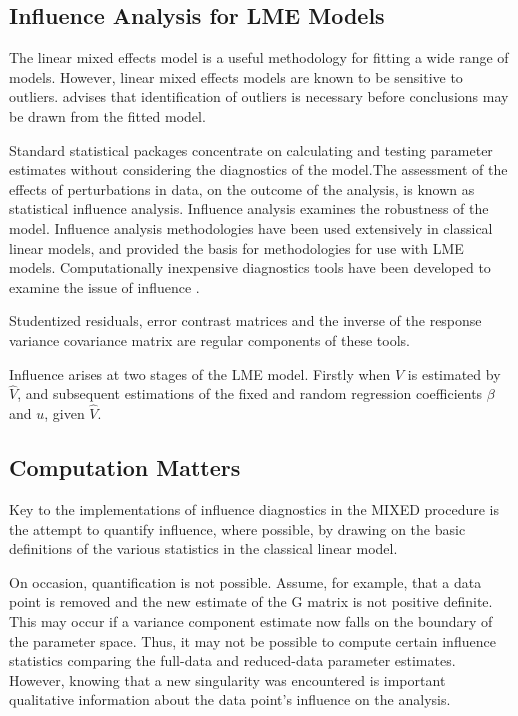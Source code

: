 \documentclass[Main.tex]{subfiles}
\begin{document}
	
		\subsection{Influence Analysis for LME Models} %
		The linear mixed effects model is a useful methodology for fitting a wide range of models. However, linear mixed effects models are known to be sensitive to outliers. \citet{CPJ} advises that identification of outliers is necessary before conclusions may be drawn from the fitted model.
		
		Standard statistical packages concentrate on calculating and testing parameter estimates without considering the diagnostics of the model.The assessment of the effects of perturbations in data, on the outcome of the analysis, is known as statistical influence analysis. Influence analysis examines the robustness of the model. Influence analysis methodologies have been used extensively in classical linear models, and provided the basis for methodologies for use with LME models.
		Computationally inexpensive diagnostics tools have been developed to examine the issue of influence \citep{Zewotir}.
		
		Studentized residuals, error contrast matrices and the inverse of the response variance covariance matrix are regular components of these tools.
		
		Influence arises at two stages of the LME model. Firstly when $V$ is estimated by $\hat{V}$, and subsequent
		estimations of the fixed and random regression coefficients $\beta$ and $u$, given $\hat{V}$.
		
		
		
		
				\subsection{Computation Matters}
				Key to the implementations of influence diagnostics in the MIXED procedure is the attempt to quantify influence, where possible, by drawing on the basic definitions of the various statistics in the classical linear	model. 
				
				On occasion, quantification is not possible. Assume, for example, that a data point is removed
				and the new estimate of the G matrix is not positive definite. This may occur if a variance component estimate now falls on the boundary of the parameter space. Thus, it may not be possible to compute certain influence statistics comparing the full-data and reduced-data parameter estimates. However, knowing that a new singularity was encountered is important qualitative information about the data point’s influence on	the analysis.
		\newpage
\end{document}
